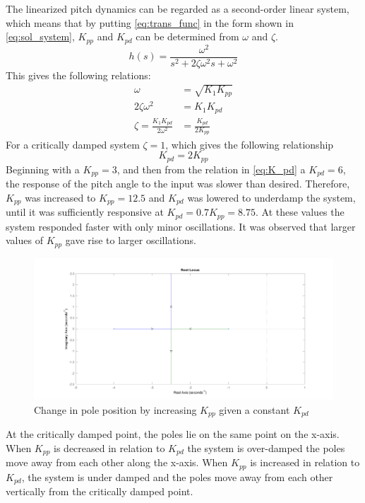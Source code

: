 %
The linearized pitch dynamics can be regarded as a second-order linear
system, which means that by putting \cref{eq:trans_func} in the form
shown in \cref{eq:sol_system}, $K_{pp}$ and $K_{pd}$ can be determined
from $\omega$ and $\zeta$.
%
\begin{equation}
  \label{eq:sol_system}
  h(s) = \frac{\omega^2}{s^2+2\zeta\omega^2s+\omega^2}
\end{equation}
%
This gives the following relations:
%
\begin{align}
  \label{eq:omega}
  \omega &= \sqrt{K_ 1K_ {pp}} \\
  2\zeta\omega^2 &= K_ 1K_ {pd} \nonumber \\
  \label{eq:zeta}
  \zeta = \frac{K_ 1K_ {pd}}{2\omega^2} &= \frac{K_{pd}}{2K_{pp}}
\end{align}
%
For a critically damped system $\zeta = 1$, which gives the following
relationship
%
\begin{equation}
  \label{eq:K_pd}
  K_{pd} = 2K_{pp}
\end{equation}
%
Beginning with a $K_{pp} = 3$, and then from the relation in
\cref{eq:K_pd} a $K_{pd} = 6$, the response of the pitch angle
to the input was slower than desired. Therefore, $K_{pp}$ was
increased to $K_{pp} = 12.5$ and $K_{pd}$ was lowered to underdamp the
system, until it  was sufficiently responsive at $K_{pd} = 0.7K_{pp} =
8.75$. At these values the system responded faster with only minor
oscillations. It was observed that larger values of $K_{pp}$ gave rise
to larger oscillations.
%
\begin{figure}[H]
  \caption{Change in pole position by increasing $K_{pp}$ given a
    constant $K_{pd}$}
  \label{fig:Root_Locus}
  \includegraphics[width=\textwidth]{images/Root_Locus}
\end{figure}
%
At the critically damped point, the poles lie on the same point on
the x-axis. When $K_{pp}$ is decreased in relation to $K_{pd}$ the
system is over-damped the poles move away from each other along the
x-axis. When $K_{pp}$ is increased in relation to $K_{pd}$, the system
is under damped and the poles move away from each other vertically
from the critically damped point.

